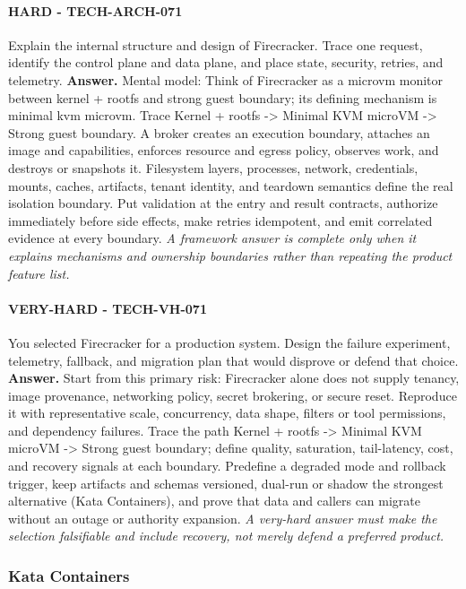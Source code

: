 \paragraph{HARD - TECH-ARCH-071} Explain the internal structure and design of Firecracker. Trace one request, identify the control plane and data plane, and place state, security, retries, and telemetry.
\textbf{Answer.} Mental model: Think of Firecracker as a microvm monitor between kernel + rootfs and strong guest boundary; its defining mechanism is minimal kvm microvm. Trace Kernel + rootfs -> Minimal KVM microVM -> Strong guest boundary. A broker creates an execution boundary, attaches an image and capabilities, enforces resource and egress policy, observes work, and destroys or snapshots it. Filesystem layers, processes, network, credentials, mounts, caches, artifacts, tenant identity, and teardown semantics define the real isolation boundary. Put validation at the entry and result contracts, authorize immediately before side effects, make retries idempotent, and emit correlated evidence at every boundary.
\textit{A framework answer is complete only when it explains mechanisms and ownership boundaries rather than repeating the product feature list.}
\paragraph{VERY-HARD - TECH-VH-071} You selected Firecracker for a production system. Design the failure experiment, telemetry, fallback, and migration plan that would disprove or defend that choice.
\textbf{Answer.} Start from this primary risk: Firecracker alone does not supply tenancy, image provenance, networking policy, secret brokering, or secure reset. Reproduce it with representative scale, concurrency, data shape, filters or tool permissions, and dependency failures. Trace the path Kernel + rootfs -> Minimal KVM microVM -> Strong guest boundary; define quality, saturation, tail-latency, cost, and recovery signals at each boundary. Predefine a degraded mode and rollback trigger, keep artifacts and schemas versioned, dual-run or shadow the strongest alternative (Kata Containers), and prove that data and callers can migrate without an outage or authority expansion.
\textit{A very-hard answer must make the selection falsifiable and include recovery, not merely defend a preferred product.}
\subsubsection*{Kata Containers}

